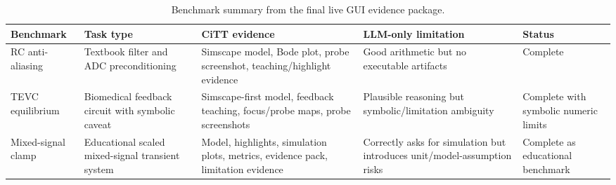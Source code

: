\begin{table}[t]
\centering
\small
\begin{tabular}{p{}p{}p{}p{}p{}}
\toprule
Benchmark & Task type & CiTT evidence & LLM-only limitation & Status \\
\midrule
RC anti-aliasing & Textbook filter and ADC preconditioning & Simscape model, Bode plot, probe screenshot, teaching/highlight evidence & Good arithmetic but no executable artifacts & Complete \\
TEVC equilibrium & Biomedical feedback circuit with symbolic caveat & Simscape-first model, feedback teaching, focus/probe maps, probe screenshots & Plausible reasoning but symbolic/limitation ambiguity & Complete with symbolic numeric limits \\
Mixed-signal clamp & Educational scaled mixed-signal transient system & Model, highlights, simulation plots, metrics, evidence pack, limitation evidence & Correctly asks for simulation but introduces unit/model-assumption risks & Complete as educational benchmark \\
\bottomrule
\end{tabular}
\caption{Benchmark summary from the final live GUI evidence package.}
\label{tab:benchmark_summary}
\end{table}
